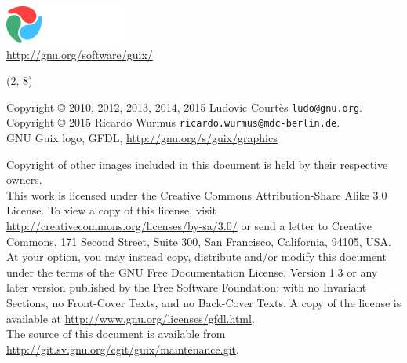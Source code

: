 \documentclass{beamer}
\begin{document}
\begin{frame}[plain]

\vfill{
  \vspace{6.5cm}
  \hfill{\includegraphics[width=0.3\textwidth]{images/guix-logo-white}}\\[0.2cm]
  \hfill{\alert{\url{http://gnu.org/software/guix/}}}
}

\end{frame}

\begin{frame}{}

  \begin{textblock}{12}(2, 8)
    \tiny{
      Copyright \copyright{} 2010, 2012, 2013, 2014, 2015 Ludovic Courtès \texttt{ludo@gnu.org}.\\
      Copyright \copyright{} 2015 Ricardo Wurmus \texttt{ricardo.wurmus@mdc-berlin.de}.
      \\[3.0mm]
      GNU Guix logo, GFDL, \url{http://gnu.org/s/guix/graphics}

      Copyright of other images included in this document is held by
      their respective owners.
      \\[3.0mm]
      This work is licensed under the \alert{Creative Commons
        Attribution-Share Alike 3.0} License.  To view a copy of this
      license, visit
      \url{http://creativecommons.org/licenses/by-sa/3.0/} or send a
      letter to Creative Commons, 171 Second Street, Suite 300, San
      Francisco, California, 94105, USA.
      \\[2.0mm]
      At your option, you may instead copy, distribute and/or modify
      this document under the terms of the \alert{GNU Free Documentation
        License, Version 1.3 or any later version} published by the Free
      Software Foundation; with no Invariant Sections, no Front-Cover
      Texts, and no Back-Cover Texts.  A copy of the license is
      available at \url{http://www.gnu.org/licenses/gfdl.html}.
      \\[2.0mm]
      The source of this document is available from
      \url{http://git.sv.gnu.org/cgit/guix/maintenance.git}.
    }
  \end{textblock}
\end{frame}
\end{document}
